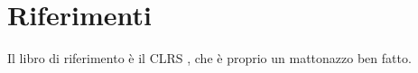 
\section*{Riferimenti}

Il libro di riferimento è il CLRS \cite{Cormen:2009:IAT:1614191},
che è proprio un mattonazzo ben fatto.
